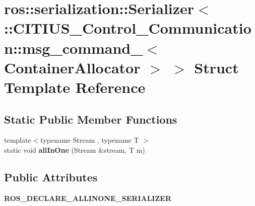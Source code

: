 \hypertarget{structros_1_1serialization_1_1_serializer_3_01_1_1_c_i_t_i_u_s___control___communication_1_1msg_7b31f66526529ad679eed00ed2038ef5}{\section{ros\-:\-:serialization\-:\-:\-Serializer$<$ \-:\-:\-C\-I\-T\-I\-U\-S\-\_\-\-Control\-\_\-\-Communication\-:\-:msg\-\_\-command\-\_\-$<$ \-Container\-Allocator $>$ $>$ \-Struct \-Template \-Reference}
\label{structros_1_1serialization_1_1_serializer_3_01_1_1_c_i_t_i_u_s___control___communication_1_1msg_7b31f66526529ad679eed00ed2038ef5}
}
\subsection*{\-Static \-Public \-Member \-Functions}
\begin{DoxyCompactItemize}
\item 
\hypertarget{structros_1_1serialization_1_1_serializer_3_01_1_1_c_i_t_i_u_s___control___communication_1_1msg_7b31f66526529ad679eed00ed2038ef5_aa203a7fb1af059fd2c3ca340455a04c5}{{\footnotesize template$<$typename Stream , typename T $>$ }\\static void {\bfseries all\-In\-One} (\-Stream \&stream, \-T m)}\label{structros_1_1serialization_1_1_serializer_3_01_1_1_c_i_t_i_u_s___control___communication_1_1msg_7b31f66526529ad679eed00ed2038ef5_aa203a7fb1af059fd2c3ca340455a04c5}

\end{DoxyCompactItemize}
\subsection*{\-Public \-Attributes}
\begin{DoxyCompactItemize}
\item 
\hypertarget{structros_1_1serialization_1_1_serializer_3_01_1_1_c_i_t_i_u_s___control___communication_1_1msg_7b31f66526529ad679eed00ed2038ef5_a36f35ad8f055dacc28cd069116caa7fc}{{\bfseries \-R\-O\-S\-\_\-\-D\-E\-C\-L\-A\-R\-E\-\_\-\-A\-L\-L\-I\-N\-O\-N\-E\-\_\-\-S\-E\-R\-I\-A\-L\-I\-Z\-E\-R}}\label{structros_1_1serialization_1_1_serializer_3_01_1_1_c_i_t_i_u_s___control___communication_1_1msg_7b31f66526529ad679eed00ed2038ef5_a36f35ad8f055dacc28cd069116caa7fc}

\end{DoxyCompactItemize}
